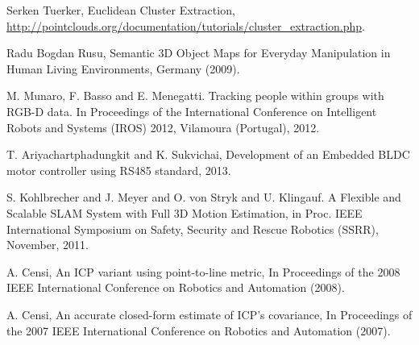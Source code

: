 \documentclass{llncs}
\begin{document}
\begin{thebibliography}{4}

 Serken Tuerker, Euclidean Cluster Extraction,\\
\url{http://pointclouds.org/documentation/tutorials/cluster_extraction.php}.

 Radu Bogdan Rusu, 
Semantic 3D Object Maps for Everyday Manipulation in Human Living Environments, Germany (2009).

 M. Munaro, F. Basso and E. Menegatti. Tracking people within groups with RGB-D data. In Proceedings of the International Conference on Intelligent Robots and Systems (IROS) 2012, Vilamoura (Portugal), 2012.

 T. Ariyachartphadungkit and K. Sukvichai, Development of an Embedded BLDC motor controller using RS485 standard, 2013.

 S. Kohlbrecher and J. Meyer and O. von Stryk and U. Klingauf. A Flexible and Scalable SLAM System with Full 3D Motion Estimation, in Proc. IEEE International Symposium on Safety, Security and Rescue Robotics (SSRR), November, 2011.

 A. Censi, An ICP variant using point-to-line metric, In Proceedings of the 2008 IEEE International Conference on Robotics and Automation (2008).

 A. Censi, An accurate closed-form estimate of ICP's covariance, In Proceedings of the 2007 IEEE International Conference on Robotics and Automation (2007).

\end{thebibliography}
\end{document}
